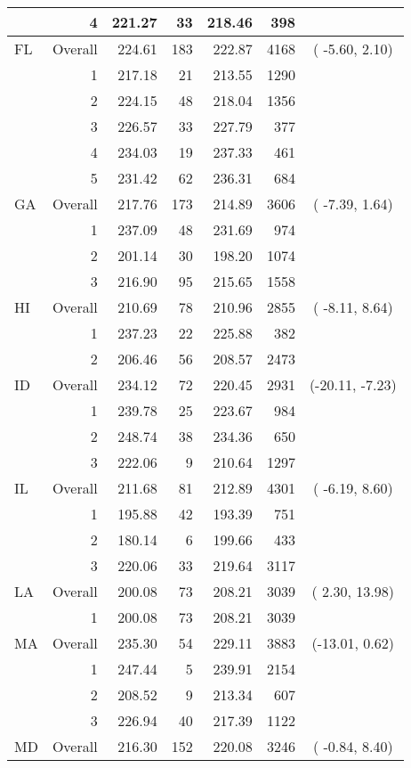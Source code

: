 \begin{longtable}{lrrr@{\extracolsep{.25cm}}rrc}
   & 4 & 221.27 &  33 & 218.46 & 398 &  \\ 
   \hline
FL & Overall & 224.61 & 183 & 222.87 & 4168 & ( -5.60,  2.10) \\ 
   & 1 & 217.18 &  21 & 213.55 & 1290 &  \\ 
   & 2 & 224.15 &  48 & 218.04 & 1356 &  \\ 
   & 3 & 226.57 &  33 & 227.79 & 377 &  \\ 
   & 4 & 234.03 &  19 & 237.33 & 461 &  \\ 
   & 5 & 231.42 &  62 & 236.31 & 684 &  \\ 
   \hline
GA & Overall & 217.76 & 173 & 214.89 & 3606 & ( -7.39,  1.64) \\ 
   & 1 & 237.09 &  48 & 231.69 & 974 &  \\ 
   & 2 & 201.14 &  30 & 198.20 & 1074 &  \\ 
   & 3 & 216.90 &  95 & 215.65 & 1558 &  \\ 
   \hline
HI & Overall & 210.69 &  78 & 210.96 & 2855 & ( -8.11,  8.64) \\ 
   & 1 & 237.23 &  22 & 225.88 & 382 &  \\ 
   & 2 & 206.46 &  56 & 208.57 & 2473 &  \\ 
   \hline
ID & Overall & 234.12 &  72 & 220.45 & 2931 & (-20.11, -7.23) \\ 
   & 1 & 239.78 &  25 & 223.67 & 984 &  \\ 
   & 2 & 248.74 &  38 & 234.36 & 650 &  \\ 
   & 3 & 222.06 &   9 & 210.64 & 1297 &  \\ 
   \hline
IL & Overall & 211.68 &  81 & 212.89 & 4301 & ( -6.19,  8.60) \\ 
   & 1 & 195.88 &  42 & 193.39 & 751 &  \\ 
   & 2 & 180.14 &   6 & 199.66 & 433 &  \\ 
   & 3 & 220.06 &  33 & 219.64 & 3117 &  \\ 
   \hline
LA & Overall & 200.08 &  73 & 208.21 & 3039 & (  2.30, 13.98) \\ 
   & 1 & 200.08 &  73 & 208.21 & 3039 &  \\ 
   \hline
MA & Overall & 235.30 &  54 & 229.11 & 3883 & (-13.01,  0.62) \\ 
   & 1 & 247.44 &   5 & 239.91 & 2154 &  \\ 
   & 2 & 208.52 &   9 & 213.34 & 607 &  \\ 
   & 3 & 226.94 &  40 & 217.39 & 1122 &  \\ 
   \hline
MD & Overall & 216.30 & 152 & 220.08 & 3246 & ( -0.84,  8.40) \\ 

\end{longtable}

